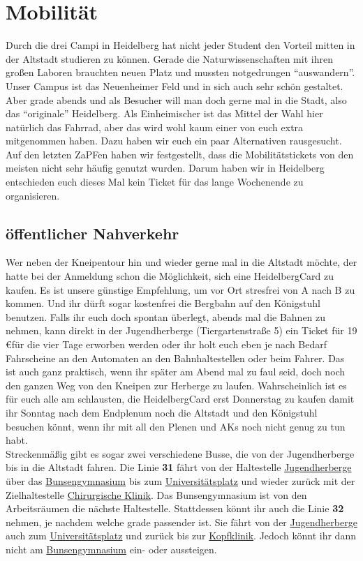 \section{Mobilität}
  Durch die drei Campi in Heidelberg hat nicht jeder Student den Vorteil mitten
  in der Altstadt studieren zu können. Gerade die Naturwissenschaften mit ihren großen
  Laboren brauchten neuen Platz und mussten notgedrungen ``auswandern''. Unser Campus ist
  das Neuenheimer Feld und in sich auch sehr schön gestaltet.
  Aber grade abends und als Besucher will man doch gerne mal in die Stadt, also das
  ``originale'' Heidelberg.
  Als Einheimischer ist das Mittel der Wahl hier natürlich das Fahrrad, aber das wird wohl
  kaum einer von euch extra mitgenommen haben. Dazu haben wir euch ein paar Alternativen
  rausgesucht. Auf den letzten ZaPFen haben wir festgestellt, dass die Mobilitätstickets von den meisten
  nicht sehr häufig genutzt wurden. Darum haben wir in Heidelberg entschieden euch
  dieses Mal kein Ticket für das lange Wochenende zu organisieren.

  \subsection{öffentlicher Nahverkehr}
    Wer neben der Kneipentour hin und wieder gerne mal in die Altstadt möchte, der hatte bei
    der Anmeldung schon die Möglichkeit, sich eine HeidelbergCard zu kaufen.
    Es ist unsere günstige Empfehlung, um vor Ort stresfrei von A nach B zu kommen.
    Und ihr dürft sogar kostenfrei die Bergbahn auf den Königstuhl benutzen.
    Falls ihr euch doch spontan überlegt, abends mal die Bahnen zu nehmen, kann
    direkt in der Jugendherberge (Tiergartenstraße 5) ein Ticket für 19 \euro für die vier Tage
    erworben werden oder ihr holt euch eben je nach Bedarf Fahrscheine an den Automaten
    an den Bahnhaltestellen oder beim Fahrer.
    Das ist auch ganz praktisch, wenn ihr später am Abend mal zu faul seid, doch
    noch den ganzen Weg von den Kneipen zur Herberge zu laufen.
    Wahrscheinlich ist es für euch alle am schlausten, die HeidelbergCard erst
    Donnerstag zu kaufen damit ihr Sonntag nach dem Endplenum noch die Altstadt und
    den Königstuhl besuchen könnt, wenn ihr mit all den Plenen und
    AKs noch nicht genug zu tun habt. \\
    Streckenmäßig gibt es sogar zwei verschiedene Busse, die von der Jugendherberge
    bis in die Altstadt fahren. Die Linie \textbf{31} fährt von der Haltestelle
    \underline{Jugendherberge} über das \underline{Bunsengymnasium} bis zum
    \underline{Universitätsplatz} und wieder zurück mit der Zielhaltestelle
    \underline{Chirurgische Klinik}. Das Bunsengymnasium ist von den Arbeitsräumen
    die nächste Haltestelle. Stattdessen könnt ihr auch die Linie \textbf{32} nehmen,
    je nachdem welche grade passender ist. Sie fährt von der \underline{Jugendherberge}
    auch zum \underline{Universitätsplatz} und zurück bis zur \underline{Kopfklinik}.
    Jedoch könnt ihr dann nicht am \underline{Bunsengymnasium} ein- oder aussteigen.

